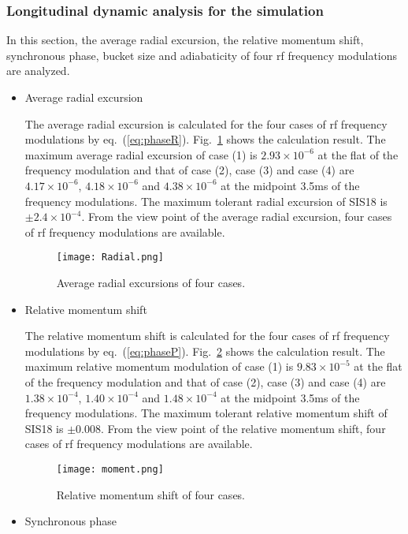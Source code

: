 \subsubsection{Longitudinal dynamic analysis for the simulation}
In this section, the average radial excursion, the relative momentum shift, synchronous phase, bucket size and adiabaticity of four rf frequency modulations are analyzed. 
\begin{itemize}
\item Average radial excursion

The average radial excursion is calculated for the four cases of rf frequency modulations by eq.~(\ref{eq:phaseR}). Fig.~\ref{radial} shows the calculation result. The maximum average radial excursion of case (1) is $2.93\times10^{-6}$ at the flat of the frequency modulation and that of case (2), case (3) and case (4) are $ 4.17\times10^{-6}$, $4.18\times 10^{-6}$ and $4.38\times 10^{-6}$ at the midpoint 3.5ms of the frequency modulations. The maximum tolerant radial excursion of SIS18 is $\pm 2.4\times10^{-4}$. From the view point of the average radial excursion, four cases of rf frequency modulations are available.
\begin{figure}[!htb]
   \centering   
   \texttt{[image: Radial.png]}
   \caption{Average radial excursions of four cases.}
   \label{radial}
\end{figure}

\item Relative momentum shift

The relative momentum shift is calculated for the four cases of rf frequency modulations by eq.~(\ref{eq:phaseP}). Fig.~\ref{moment} shows the calculation result. The maximum relative momentum modulation of case (1) is $9.83\times 10^{-5}$ at the flat of the frequency modulation and that of case (2), case (3) and case (4) are $1.38 \times10^{-4}$, $1.40\times 10^{-4}$ and $1.48\times 10^{-4}$ at the midpoint 3.5ms of the frequency modulations. The maximum tolerant relative momentum shift of SIS18 is $\pm 0.008$. From the view point of the relative momentum shift, four cases of rf frequency modulations are available.
\begin{figure}[!htb]
   \centering   
   \texttt{[image: moment.png]}
   \caption{Relative momentum shift of four cases.}
   \label{moment}
\end{figure}
\item Synchronous phase


\end{itemize}
